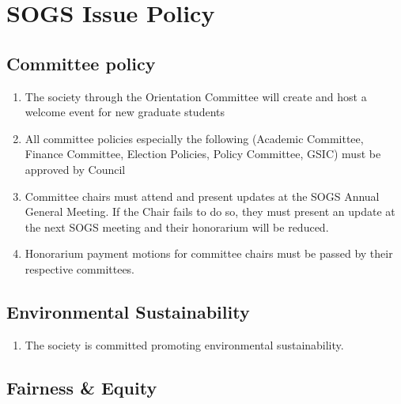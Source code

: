\section{SOGS Issue Policy}


\subsection{Committee policy}
\begin{enumerate}
\item 	The society through the Orientation Committee will create and host a welcome event for new graduate students 
\item	All committee policies especially the following (Academic Committee, Finance Committee, Election Policies, Policy Committee, GSIC) must be approved by Council 
\item	Committee chairs must attend and present updates at the SOGS Annual General Meeting. If the Chair fails to do so, they must present an update at the next SOGS meeting and their honorarium will be reduced.  
\item	Honorarium payment motions for committee chairs must be passed by their respective committees. 
\end{enumerate}

\subsection{Environmental Sustainability}
\begin{enumerate}
\item The society is committed promoting environmental sustainability. 
\end{enumerate}


\subsection{Fairness \& Equity}
